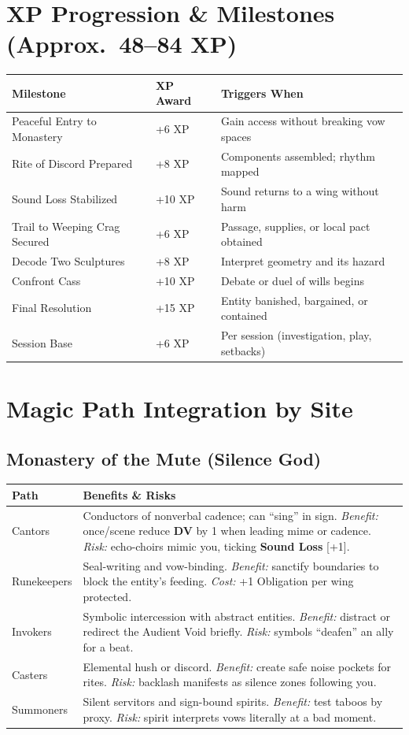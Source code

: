\documentclass[11pt]{article}
\newcommand{\Clock}[2]{\textbf{#1} [#2]}
\newcommand{\Term}[1]{\textbf{#1}}
\newcommand{\DV}{\Term{DV}}
\begin{document}
\section{XP Progression \& Milestones (Approx.\ 48--84 XP)}
\label{app:xp}
\begin{tabularx}{\linewidth}{@{}l l X@{}}
\toprule
\textbf{Milestone} & \textbf{XP Award} & \textbf{Triggers When}\\
\midrule
Peaceful Entry to Monastery & +6 XP & Gain access without breaking vow spaces\\
Rite of Discord Prepared & +8 XP & Components assembled; rhythm mapped\\
Sound Loss Stabilized & +10 XP & Sound returns to a wing without harm\\
Trail to Weeping Crag Secured & +6 XP & Passage, supplies, or local pact obtained\\
Decode Two Sculptures & +8 XP & Interpret geometry and its hazard\\
Confront Cass & +10 XP & Debate or duel of wills begins\\
Final Resolution & +15 XP & Entity banished, bargained, or contained\\
Session Base & +6 XP & Per session (investigation, play, setbacks)\\
\bottomrule
\end{tabularx}

\section{Magic Path Integration by Site}
\label{app:magic-by-site}
\subsection*{Monastery of the Mute (Silence God)}
\begin{tabularx}{\linewidth}{@{}l X@{}}
\toprule
\textbf{Path} & \textbf{Benefits \& Risks}\\
\midrule
Cantors & Conductors of nonverbal cadence; can ``sing'' in sign. \emph{Benefit:} once/scene reduce \DV{} by 1 when leading mime or cadence. \emph{Risk:} echo-choirs mimic you, ticking \Clock{Sound Loss}{+1}.\\
Runekeepers & Seal-writing and vow-binding. \emph{Benefit:} sanctify boundaries to block the entity's feeding. \emph{Cost:} +1 Obligation per wing protected.\\
Invokers & Symbolic intercession with abstract entities. \emph{Benefit:} distract or redirect the Audient Void briefly. \emph{Risk:} symbols ``deafen'' an ally for a beat.\\
Casters & Elemental hush or discord. \emph{Benefit:} create safe noise pockets for rites. \emph{Risk:} backlash manifests as silence zones following you.\\
Summoners & Silent servitors and sign-bound spirits. \emph{Benefit:} test taboos by proxy. \emph{Risk:} spirit interprets vows literally at a bad moment.\\
\bottomrule
\end{tabularx}
\end{document}
